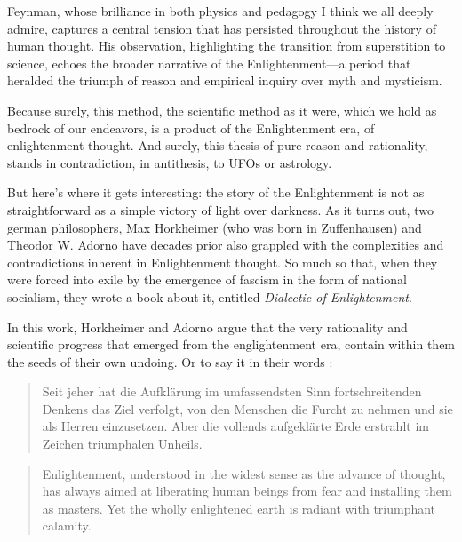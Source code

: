 Feynman, whose brilliance in both physics and pedagogy I think we all deeply admire,
captures a central tension that has persisted throughout the history of human
thought. His observation, highlighting the transition from superstition to
science, echoes the broader narrative of the Enlightenment---a period that
heralded the triumph of reason and empirical inquiry over myth and mysticism.


Because surely, this method, the scientific
method as it were, which we hold as bedrock of our endeavors,
is a product of the Enlightenment era, of enlightenment
thought. And surely, this thesis of pure reason and rationality, stands in
contradiction, in antithesis, to UFOs or astrology.

But here’s where it gets interesting: the story of the Enlightenment is not as
straightforward as a simple victory of light over darkness.  As it turns out,
two german philosophers, Max Horkheimer (who was born in Zuffenhausen) and
Theodor W. Adorno have decades prior also grappled with the complexities and
contradictions inherent in Enlightenment thought. So much so that, when they
were forced into exile by the emergence of fascism in the form of national
socialism, they wrote a book about it, entitled \emph{Dialectic of
Enlightenment}.

In this work, Horkheimer and Adorno argue that the very rationality and
scientific progress that emerged from the englightenment era, contain within
them the seeds of their own undoing. Or to say it in their words
\cite{horkheimerGesammelteSchriftenBand1987,horkheimerDialecticEnlightenmentPhilosophical2002}:
\blockquote{
  Seit jeher hat die Aufkl\"arung im umfassendsten Sinn fortschreitenden Denkens
  das Ziel verfolgt, von den Menschen die Furcht zu nehmen und sie als Herren
  einzusetzen. Aber die vollends aufgekl\"arte Erde erstrahlt im Zeichen
  triumphalen Unheils.
} 
\blockquote{
Enlightenment, understood in the widest sense as the advance of
thought, has always aimed at liberating human beings from fear and
installing them as masters. Yet the wholly enlightened earth is radiant with
triumphant calamity. 
}

